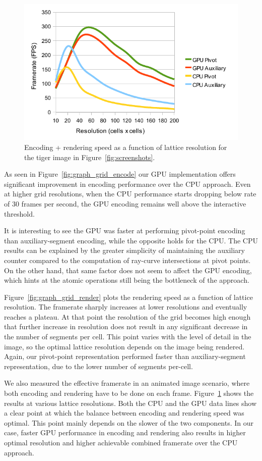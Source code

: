 \documentclass[11pt,a4paper,twoside]{article}
\begin{document}
\begin {figure} [h]
	\centering
	\includegraphics[width=0.6\columnwidth] {figures/graph_grid_encode_render}
	\caption {Encoding + rendering speed as a function of lattice resolution for the tiger image in Figure~\ref{fig:screenshots}.}
	\label {fig:graph_grid_encode_render}
\end {figure}

As seen in Figure~\ref{fig:graph_grid_encode} our GPU implementation offers significant improvement in encoding performance over the CPU approach. Even at higher grid resolutions, when the CPU performance starts dropping below rate of 30 frames per second, the GPU encoding remains well above the interactive threshold.

It is interesting to see the GPU was faster at performing pivot-point encoding than auxiliary-segment encoding, while the opposite holds for the CPU. The CPU results can be explained by the greater simplicity of maintaining the auxiliary counter compared to the computation of ray-curve intersections at pivot points. On the other hand, that same factor does not seem to affect the GPU encoding, which hints at the atomic operations still being the bottleneck of the approach.

Figure~\ref{fig:graph_grid_render} plots the rendering speed as a function of lattice resolution. The framerate sharply increases at lower resolutions and eventually reaches a plateau. At that point the resolution of the grid becomes high enough that further increase in resolution does not result in any significant decrease in the number of segments per cell. This point varies with the level of detail in the image, so the optimal lattice resolution depends on the image being rendered. Again, our pivot-point representation performed faster than auxiliary-segment representation, due to the lower number of segments per-cell.

We also measured the effective framerate in an animated image scenario, where both encoding and rendering have to be done on each frame. Figure~\ref{fig:graph_grid_encode_render} shows the results at various lattice resolutions. Both the CPU and the GPU data lines show a clear point at which the balance between encoding and rendering speed was optimal. This point mainly depends on the slower of the two components. In our case, faster GPU performance in encoding and rendering also results in higher optimal resolution and higher achievable combined framerate over the CPU approach.
\end{document}
